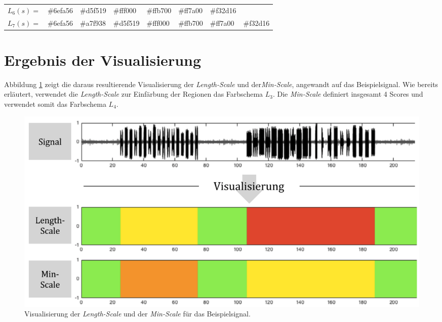 \begin{table}[h]
\begin{tabular}{@{}clllllll@{}}
\multicolumn{1}{l|}{$L_6(s) = $} & \multicolumn{1}{l|}{\cellcolor[HTML]{6EFA56}\#6efa56} & \multicolumn{1}{l|}{\cellcolor[HTML]{D5F519}\#d5f519} & \multicolumn{1}{l|}{\cellcolor[HTML]{FFF000}\#fff000} & \multicolumn{1}{l|}{\cellcolor[HTML]{FFB700}\#ffb700} & \multicolumn{1}{l|}{\cellcolor[HTML]{FF7A00}\#ff7a00} & \multicolumn{1}{l|}{\cellcolor[HTML]{F32D16}\#f32d16} &                                                       \\ \cmidrule(l){2-8} 
\multicolumn{1}{l|}{$L_7(s) = $} & \multicolumn{1}{l|}{\cellcolor[HTML]{6EFA56}\#6efa56} & \multicolumn{1}{l|}{\cellcolor[HTML]{A7F938}\#a7f938} & \multicolumn{1}{l|}{\cellcolor[HTML]{D5F519}\#d5f519} & \multicolumn{1}{l|}{\cellcolor[HTML]{FFF000}\#fff000} & \multicolumn{1}{l|}{\cellcolor[HTML]{FFB700}\#ffb700} & \multicolumn{1}{l|}{\cellcolor[HTML]{FF7A00}\#ff7a00} & \multicolumn{1}{l|}{\cellcolor[HTML]{F32D16}\#f32d16} \\ \bottomrule
\end{tabular}
\end{table}

\section{Ergebnis der Visualisierung}

Abbildung \ref{fig:viz_without_t_01} zeigt die daraus resultierende Visualisierung der \emph{Length-Scale} und der\emph{Min-Scale}, angewandt auf das Beispielsignal. Wie bereits erläutert, verwendet die \emph{Length-Scale} zur Einfärbung der Regionen das Farbschema $L_3$. Die \emph{Min-Scale} definiert insgesamt 4 Scores und verwendet somit das Farbschema $L_4$.

\begin{figure}[h]
	\centering
	\includegraphics[width=1\textwidth]{bilder/viz_without_t_04.png}
	\caption{Visualisierung der \emph{Length-Scale} und der \emph{Min-Scale} für das Beispielsignal. }
	\label{fig:viz_without_t_01}
\end{figure}

